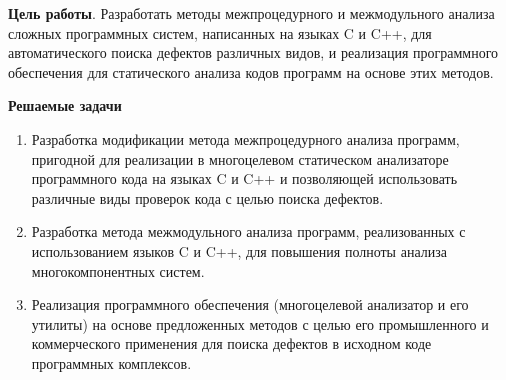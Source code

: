 \documentclass[hyperref={pdfpagelabels=false},10pt,gray]{beamer}
\begin{document}

\begin{frame}
\textbf{\Large{Цель работы}}. Разработать методы межпроцедурного и межмодульного анализа сложных программных систем, написанных на языках C и C++, для автоматического поиска дефектов различных видов, и реализация программного обеспечения для статического анализа кодов программ на основе этих методов.

\vspace{5pt}
\textbf{\Large{Решаемые задачи}}

\begin{enumerate}
  \item Разработка модификации метода межпроцедурного анализа программ, пригодной для реализации в многоцелевом статическом анализаторе программного кода на языках C и C++ и позволяющей использовать различные виды проверок кода с целью поиска дефектов.
  \item Разработка метода межмодульного анализа программ, реализованных с использованием языков C и C++, для повышения полноты анализа многокомпонентных систем.
  \item Реализация программного обеспечения (многоцелевой анализатор и его утилиты) на основе предложенных методов с целью его промышленного и коммерческого применения для поиска дефектов в исходном коде программных комплексов.
\end{enumerate}

\end{frame}
\end{document}
